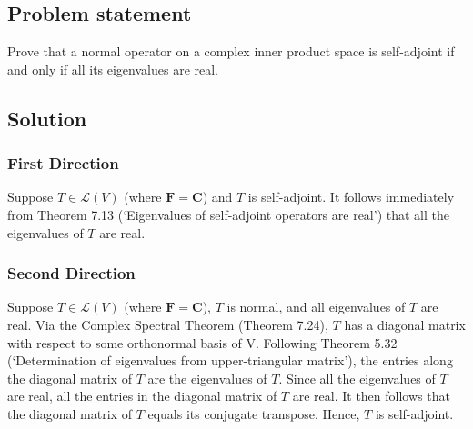 \documentclass{article}
\begin{document}
\subsection*{Problem statement}
Prove that a normal operator on a complex inner product space is self-adjoint if and only if all its eigenvalues are real.

\subsection*{Solution}
\subsubsection*{First Direction}
Suppose $T\in\mathcal{L}(V)$ (where $\mathbf{F}=\mathbf{C}$) and $T$ is self-adjoint. It follows immediately from Theorem 7.13 (`Eigenvalues of self-adjoint operators are real') that all the eigenvalues of $T$ are real.

\subsubsection*{Second Direction}
Suppose $T\in\mathcal{L}(V)$ (where $\mathbf{F}=\mathbf{C}$), $T$ is normal, and all eigenvalues of $T$ are real. Via the Complex Spectral Theorem (Theorem 7.24), $T$ has a diagonal matrix with respect to some orthonormal basis of V. Following Theorem 5.32 (`Determination of eigenvalues from upper-triangular matrix'), the entries along the diagonal matrix of $T$ are the eigenvalues of $T$. Since all the eigenvalues of $T$ are real, all the entries in the diagonal matrix of $T$ are real. It then follows that the diagonal matrix of $T$ equals its conjugate transpose. Hence, $T$ is self-adjoint.
\end{document}
